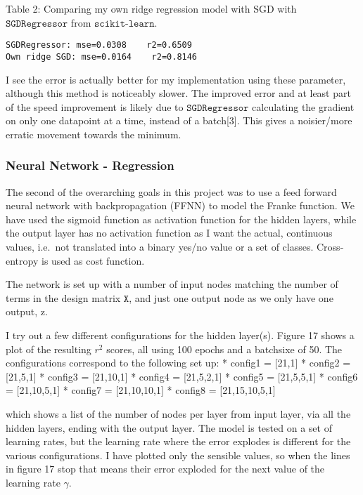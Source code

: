 \documentclass[11pt]{article}
\begin{document}
    Table 2: Comparing my own ridge regression model with SGD with
\(\texttt{SGDRegressor}\) from \(\texttt{scikit-learn}\).

    \begin{Verbatim}[commandchars=\\\{\}]
SGDRegressor: mse=0.0308    r2=0.6509
Own ridge SGD: mse=0.0164    r2=0.8146
    \end{Verbatim}

    I see the error is actually better for my implementation using these
parameter, although this method is noticeably slower. The improved error
and at least part of the speed improvement is likely due to
\(\texttt{SGDRegressor}\) calculating the gradient on only one datapoint
at a time, instead of a batch{[}3{]}. This gives a noisier/more erratic
movement towards the minimum.

    \hypertarget{neural-network---regression}{%
\subsubsection{Neural Network -
Regression}\label{neural-network---regression}}

The second of the overarching goals in this project was to use a feed
forward neural network with backpropagation (FFNN) to model the Franke
function. We have used the sigmoid function as activation function for
the hidden layers, while the output layer has no activation function as
I want the actual, continuous values, i.e.~not translated into a binary
yes/no value or a set of classes. Cross-entropy is used as cost
function.

The network is set up with a number of input nodes matching the number
of terms in the design matrix \(\texttt{X}\), and just one output node
as we only have one output, z.

I try out a few different configurations for the hidden layer(s). Figure
17 shows a plot of the resulting \(r^2\) scores, all using 100 epochs
and a batchsixe of 50. The configurations correspond to the following
set up: * config1 = {[}21,1{]} * config2 = {[}21,5,1{]} * config3 =
{[}21,10,1{]} * config4 = {[}21,5,2,1{]} * config5 = {[}21,5,5,1{]} *
config6 = {[}21,10,5,1{]} * config7 = {[}21,10,10,1{]} * config8 =
{[}21,15,10,5,1{]}

which shows a list of the number of nodes per layer from input layer,
via all the hidden layers, ending with the output layer. The model is
tested on a set of learning rates, but the learning rate where the error
explodes is different for the various configurations. I have plotted
only the sensible values, so when the lines in figure 17 stop that means
their error exploded for the next value of the learning rate \(\gamma\).
\end{document}
